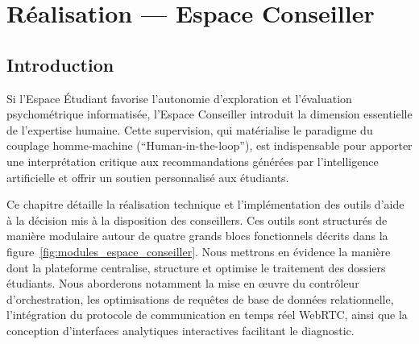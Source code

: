 
\chapter{Réalisation — Espace Conseiller}
\label{chap:realisation_conseiller}

\section*{Introduction}

Si l'Espace Étudiant favorise l'autonomie d'exploration et l'évaluation psychométrique informatisée, l'Espace Conseiller introduit la dimension essentielle de l'expertise humaine. Cette supervision, qui matérialise le paradigme du couplage homme-machine (``Human-in-the-loop''), est indispensable pour apporter une interprétation critique aux recommandations générées par l'intelligence artificielle et offrir un soutien personnalisé aux étudiants.

Ce chapitre détaille la réalisation technique et l'implémentation des outils d'aide à la décision mis à la disposition des conseillers. Ces outils sont structurés de manière modulaire autour de quatre grands blocs fonctionnels décrits dans la figure~\ref{fig:modules_espace_conseiller}. Nous mettrons en évidence la manière dont la plateforme centralise, structure et optimise le traitement des dossiers étudiants. Nous aborderons notamment la mise en œuvre du contrôleur d'orchestration, les optimisations de requêtes de base de données relationnelle, l'intégration du protocole de communication en temps réel WebRTC, ainsi que la conception d'interfaces analytiques interactives facilitant le diagnostic.

